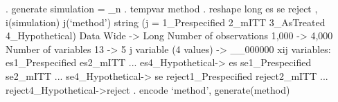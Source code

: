 . generate simulation = _n
{\smallskip}
. tempvar method
{\smallskip}
. reshape long es se reject , i(simulation) j(`method') string
(j = 1_Prespecified 2_mITT 3_AsTreated 4_Hypothetical)
{\smallskip}
Data                               Wide   ->   Long
Number of observations            1,000   ->   4,000       
Number of variables                  13   ->   5           
j variable (4 values)                     ->   __000000
xij variables:
es1_Prespecified es2_mITT ... es4_Hypothetical-> es
se1_Prespecified se2_mITT ... se4_Hypothetical-> se
reject1_Prespecified reject2_mITT ... reject4_Hypothetical->reject
{\smallskip}
. encode `method', generate(method)
{\smallskip}
